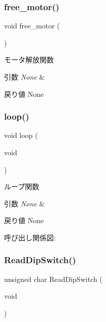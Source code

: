 \subsubsection{\texorpdfstring{free\_motor()}{free\_motor()}}
{\footnotesize\ttfamily void free\+\_\+motor (\begin{DoxyParamCaption}{ }\end{DoxyParamCaption})}



モータ解放関数 


\begin{DoxyParams}{引数}
{\em None} & \\
\hline
\end{DoxyParams}
\begin{DoxyReturn}{戻り値}
None 
\end{DoxyReturn}
\mbox{\label{iraira__bo__up__down_8ino_a0b33edabd7f1c4e4a0bf32c67269be2f}} 
\subsubsection{\texorpdfstring{loop()}{loop()}}
{\footnotesize\ttfamily void loop (\begin{DoxyParamCaption}\item[{void}]{ }\end{DoxyParamCaption})}



ループ関数 


\begin{DoxyParams}{引数}
{\em None} & \\
\hline
\end{DoxyParams}
\begin{DoxyReturn}{戻り値}
None 
\end{DoxyReturn}
呼び出し関係図\+:
\mbox{\label{iraira__bo__up__down_8ino_a77b0a767d95108a48a54b857588d2863}} 
\subsubsection{\texorpdfstring{ReadDipSwitch()}{ReadDipSwitch()}}
{\footnotesize\ttfamily unsigned char Read\+Dip\+Switch (\begin{DoxyParamCaption}\item[{void}]{ }\end{DoxyParamCaption})}



